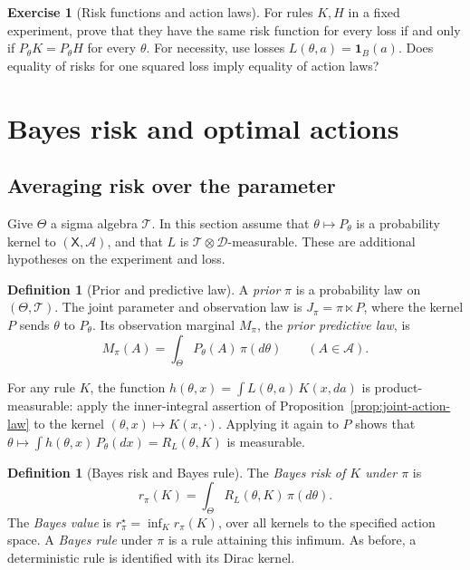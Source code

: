 \documentclass[11pt,oneside]{book}
\theoremstyle{definition}
\newtheorem{definition}[theorem]{Definition}
\newtheorem{exercise}{Exercise}[section]
\theoremstyle{remark}
\begin{document}
\begin{exercise}[Risk functions and action laws]
\label{exer:risks-identify-action-marginals}
For rules $K,H$ in a fixed experiment, prove that they have the same
risk function for every loss if and only if $P_\theta K=P_\theta H$ for
every $\theta$. For necessity, use losses $L(\theta,a)=\mathbf 1_B(a)$.
Does equality of risks for one squared loss imply equality of action laws?
\end{exercise}

\clearpage
\section{Bayes risk and optimal actions}
\label{sec:bayes-risk}

\subsection{Averaging risk over the parameter}
\label{subsec:prior-risk}

Give $\Theta$ a sigma algebra $\mathcal T$. In this section assume that
$\theta\mapsto P_\theta$ is a probability kernel to $(\mathsf X,\mathcal A)$,
and that $L$ is $\mathcal T\otimes\mathcal D$-measurable. These are
additional hypotheses on the experiment and loss.

\begin{definition}[Prior and predictive law]
\label{def:prior-predictive}
A \emph{prior} $\pi$ is a probability law on $(\Theta,\mathcal T)$.
The joint parameter and observation law is $J_\pi=\pi\ltimes P$, where
the kernel $P$ sends $\theta$ to $P_\theta$. Its observation marginal
$M_\pi$, the \emph{prior predictive law}, is
\[
M_\pi(A)=\int_\Theta P_\theta(A)\,\pi(d\theta)
\qquad(A\in\mathcal A).
\]
\end{definition}

For any rule $K$, the function
$h(\theta,x)=\int L(\theta,a)\,K(x,da)$ is product-measurable:
apply the inner-integral assertion of Proposition~\ref{prop:joint-action-law}
to the kernel $(\theta,x)\mapsto K(x,\cdot)$. Applying it again to $P$
shows that $\theta\mapsto\int h(\theta,x)\,P_\theta(dx)=R_L(\theta,K)$
is measurable.

\begin{definition}[Bayes risk and Bayes rule]
\label{def:bayes-risk}
The \emph{Bayes risk of $K$ under $\pi$} is
\[
r_\pi(K)=\int_\Theta R_L(\theta,K)\,\pi(d\theta).
\]
The \emph{Bayes value} is $r_\pi^\star=\inf_K r_\pi(K)$, over all kernels
to the specified action space. A \emph{Bayes rule} under $\pi$ is a rule
attaining this infimum. As before, a deterministic rule is identified
with its Dirac kernel.
\end{definition}
\end{document}

